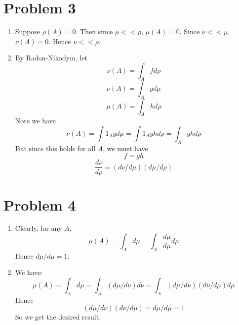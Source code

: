 \documentclass[10pt,letter]{article}
\begin{document}
\section*{Problem 3}
\begin{enumerate}[label=(\alph*)]
\item Suppose $\rho(A) = 0$. Then since $\mu << \rho$, $\mu(A) = 0$. Since $\nu << \mu$, $\nu(A) = 0$. Hence $\nu << \rho$.
\item By Radon-Nikodym, let
\[ \nu(A) = \int_A f d\rho  \]
\[ \nu(A) = \int_A g d\mu  \]
\[ \mu(A) = \int_A h d\rho  \]
Note we have
\[ \nu(A) = \int 1_A g d\mu = \int 1_A g h d\rho = \int_A gh d\rho \]
But since this holds for all $A$, we must have
\[ f = gh \]
\[ \frac{d\nu}{d\rho} = (d\nu/d\mu)(d\mu/d\rho) \]
\end{enumerate}
\section*{Problem 4}
\begin{enumerate}[label=(\alph*)]
\item Clearly, for any $A$,
\[ \mu(A) = \int_A d\mu = \int_A \frac{d\mu}{d\mu} d\mu \]
Hence $d\mu/d\mu = 1$.
\item
We have:
\[ \mu(A) = \int_A d\mu = \int_A (d\mu/d\nu) d\nu = \int_A (d\mu/d\nu)(d\nu/d\mu) d\mu \]
Hence
\[ (d\mu/d\nu)(d\nu/d\mu) = d\mu/d\mu = 1 \]
So we get the desired result.
\end{enumerate}
\end{document}
